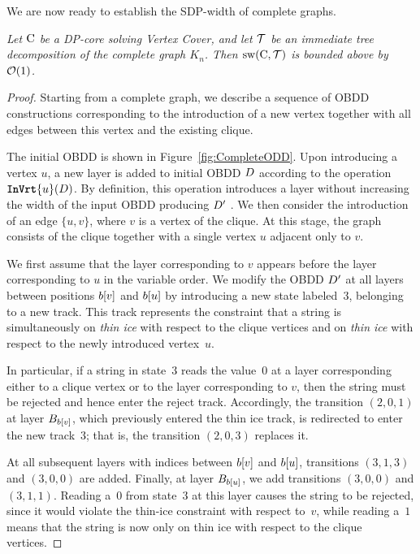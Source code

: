 We are now ready to establish the SDP-width of complete graphs.

\par\medskip
{}
{\it
Let $\mathrm{C}$ be a DP-core solving {\sc Vertex Cover}, and let $\mathcal{T}$ be an
immediate tree decomposition of the complete graph $K_n$. Then
$\mathrm{sw}(\mathrm{C},\mathcal{T})$ is bounded above by $\mathcal{O}(1)$.
}

\begin{proof}
Starting from a complete graph, we describe a sequence of OBDD constructions
corresponding to the introduction of a new vertex together with all edges
between this vertex and the existing clique.

The initial OBDD is shown in Figure~\ref{fig:CompleteODD}. Upon introducing a
vertex $u$, a new layer is added to initial OBDD $D$ according to the operation
$\texttt{\textbf{InVrt}}\{u\}(D)$. By definition, this operation introduces a layer without
increasing the width of the input OBDD producing $D'$ . We then consider the introduction of an
edge $\{u,v\}$, where $v$ is a vertex of the clique. At this stage, the graph
consists of the clique together with a single vertex $u$ adjacent only to $v$. 

We first assume that the layer corresponding to $v$ appears before the layer
corresponding to $u$ in the variable order. We modify the OBDD $D'$ at all
layers between positions $b[v]$ and $b[u]$ by introducing
a new state labeled~$3$, belonging to a new track. This track represents the
constraint that a string is simultaneously on \emph{thin ice} with respect to
the clique vertices and on \emph{thin ice} with respect to the newly introduced
vertex~$u$.

In particular, if a string in state~$3$ reads the value~$0$ at a layer
corresponding either to a clique vertex or to the layer corresponding to $v$,
then the string must be rejected and hence enter the reject track. Accordingly,
the transition $(2,0,1)$ at layer $B_{b[v]}$, which previously
entered the thin ice track, is redirected to enter the new track~$3$; that is,
the transition $(2,0,3)$ replaces it.

At all subsequent layers with indices between $b[v]$ and
$b[u]$, transitions $(3,1,3)$ and $(3,0,0)$ are added. Finally, at
layer $B_{b[u]}$, we add transitions $(3,0,0)$ and $(3,1,1)$. Reading
a~$0$ from state~$3$ at this layer causes the string to be rejected, since it
would violate the thin-ice constraint with respect to~$v$, while reading a~$1$
means that the string is now only on thin ice with respect to the clique
vertices.


\end{proof}
